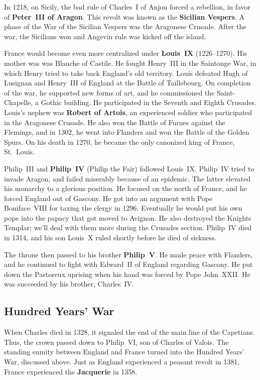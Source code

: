 In 1218, on Sicily, the bad rule of Charles~I of Anjou forced a rebellion,
in favor of \textbf{Peter~III of Aragon}.
This revolt was known as the \textbf{Sicilian Vespers}.
A phase of the War of the Sicilian Vespers was the Aragonese Crusade.
After the war, the Sicilians won and Angevin rule was kicked off the island.

France would become even more centralized under \textbf{Louis~IX} (1226--1270).
His mother was was Blanche of Castile.
He fought Henry~III in the Saintonge War, in which Henry tried to take back England's old territory.
Louis defeated Hugh of Lusignan and Henry~III of England at the Battle of Taillebourg.
On completion of the war, he supported new forms of art, and he commissioned the Saint-Chapelle, a Gothic building.
He participated in the Seventh and Eighth Crusades.
Louis's nephew was \textbf{Robert of Artois}, an experienced soldier who participated in the Aragonese Crusade.
He also won the Battle of Furnes against the Flemings,
and in 1302, he went into Flanders and won the Battle of the Golden Spurs.
On his death in 1270, he became the only canonized king of France, St.\ Louis.

Philip~III and \textbf{Philip~IV} (Philip the Fair) followed Louis~IX\@.
Philip~IV tried to invade Aragon, and failed miserably because of an epidemic.
The latter elevated his monarchy to a glorious position.
He focused on the north of France, and he forced England out of Gascony.
He got into an argument with Pope Boniface~VIII for taxing the clergy in 1296.
Eventually he would put his own pope into the papacy that got moved to Avignon.
He also destroyed the Knights Templar; we'll deal with them more during the Crusades section.
Philip~IV died in 1314, and his son Louis~X ruled shortly before he died of sickness.

The throne then passed to his brother \textbf{Philip~V}.
He made peace with Flanders, and he continued to fight with Edward~II of England regarding Gascony.
He put down the Pastoreux uprising when his hand was forced by Pope John~XXII\@.
He was succeeded by his brother, Charles~IV\@.

\subsection*{Hundred Years' War}

When Charles died in 1328, it signaled the end of the main line of the Capetians.
Thus, the crown passed down to Philip~VI, son of Charles of Valois.
The standing enmity between England and France turned into the Hundred Years' War, discussed above.
Just as England experienced a peasant revolt in 1381, France experienced the \textbf{Jacquerie} in 1358.

